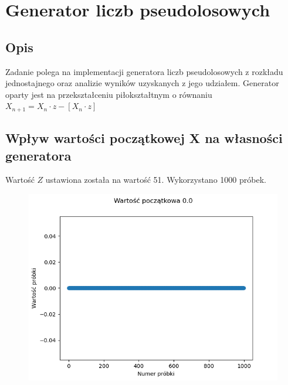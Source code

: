 \documentclass[12pt,a4paper]{article}
\begin{document}
\pdfpageheight   297mm
\pdfpagewidth    210mm

\StronaTytulowa
\SpisTresci

\pagebreak

\section{Generator liczb pseudolosowych}
  \subsection{Opis}
  Zadanie polega na implementacji generatora liczb pseudolosowych z rozkładu jednostajnego oraz analizie wyników uzyskanych z jego udziałem. Generator oparty jest na przekształceniu piłokształtnym o równaniu $X_{n+1} = X_n \cdot z - [X_n \cdot z]$ 

  \subsection{Wpływ wartości początkowej X na własności generatora}

  Wartość $Z$ ustawiona została na wartość 51. Wykorzystano 1000 próbek.

  \begin{figure}[H]
    \centering
    \includegraphics[height=0.3\textheight]{figures/Figure_1.png}
    \label{fig:1}
  \end{figure}
\end{document}
